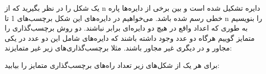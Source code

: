 \p
یک شکل را در نظر بگیرید که از n دایره تشکیل شده است و بین برخی از دایره‌ها پاره خطی رسم شده باشد. می‌خواهیم در دایره‌های این شکل برچسب‌های 1 تا n را بنویسیم 
به طوری که اعداد واقع در هیچ دو دایره‌ای برابر نباشند. دو روش برچسب‌گذاری را متمایز گوییم هرگاه دو عدد وجود داشته باشند که دایره‌های شامل این دو عدد در یکی مجاور و در دیگری غیر مجاور باشند.
مثلا برچسب‌گذاری‌های زیر غیر متمایزند:

برای هر یک از شکل‌های زیر تعداد راه‌های برچسب‌گذاری متمایز را بیابید:


